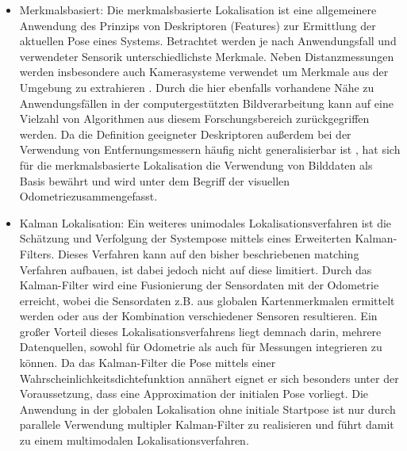 \begin{itemize}
\item Merkmalsbasiert: Die merkmalsbasierte Lokalisation ist eine allgemeinere Anwendung des Prinzips von Deskriptoren (Features) zur Ermittlung der aktuellen Pose eines Systems. Betrachtet werden je nach Anwendungsfall und verwendeter Sensorik unterschiedlichste Merkmale. Neben Distanzmessungen \cite{Tomono2004} werden insbesondere auch Kamerasysteme verwendet um Merkmale aus der Umgebung zu extrahieren \cite{Se2001}. Durch die hier ebenfalls vorhandene Nähe zu Anwendungsfällen in der computergestützten Bildverarbeitung kann auf eine Vielzahl von Algorithmen aus diesem Forschungsbereich zurückgegriffen werden. Da die Definition geeigneter Deskriptoren außerdem bei der Verwendung von Entfernungsmessern häufig nicht generalisierbar ist \red[belegen!?], hat sich für die merkmalsbasierte Lokalisation die Verwendung von Bilddaten als Basis bewährt und wird unter dem Begriff der visuellen Odometrie\red[Fußnote o.a.] zusammengefasst.\\

\item Kalman Lokalisation: Ein weiteres unimodales Lokalisationsverfahren ist die Schätzung und Verfolgung der Systempose mittels eines Erweiterten Kalman-Filters. Dieses Verfahren kann auf den bisher beschriebenen matching Verfahren aufbauen, ist dabei jedoch nicht auf diese limitiert. Durch das Kalman-Filter wird eine Fusionierung der Sensordaten mit der Odometrie erreicht, wobei die Sensordaten z.B. aus globalen Kartenmerkmalen ermittelt werden \cite{Leonard1991} oder aus der Kombination verschiedener Sensoren \cite{Roumeliotis1997} resultieren. Ein großer Vorteil dieses Lokalisationsverfahrens liegt demnach darin, mehrere Datenquellen, sowohl für Odometrie als auch für Messungen integrieren zu können. Da das Kalman-Filter die Pose mittels einer Wahrscheinlichkeitsdichtefunktion annähert eignet er sich besonders unter der Voraussetzung, dass eine Approximation der initialen Pose vorliegt. Die Anwendung in der globalen Lokalisation ohne initiale Startpose ist nur durch parallele Verwendung multipler Kalman-Filter zu realisieren und führt damit zu einem multimodalen Lokalisationsverfahren.
\end{itemize}
